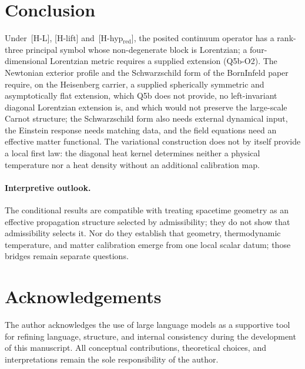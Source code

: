 \documentclass[11pt,a4paper]{article}
\begin{document}
  \section{Conclusion}
  \label{sec:conclusion}

    Under~[H-L], [H-lift] and~[H-hyp$_{\mathrm{red}}$], the posited continuum operator has a rank-three principal
    symbol whose non-degenerate block is Lorentzian; a four-dimensional Lorentzian metric requires a supplied
    extension (Q5b-O2).
    The Newtonian exterior profile and the Schwarzschild form of the Born\textendash Infeld paper require, on the
    Heisenberg carrier, a supplied spherically symmetric and asymptotically flat extension, which Q5b does not provide,
    no left-invariant diagonal Lorentzian extension is, and which would not preserve the large-scale Carnot structure;
    the Schwarzschild form also needs external dynamical input, the Einstein response needs matching data, and the field
    equations need an effective matter functional.
    The variational construction does not by itself provide a local first law: the diagonal heat
    kernel determines neither a physical temperature nor a heat density without an additional
    calibration map.

    \paragraph{Interpretive outlook.}
    The conditional results are compatible with treating spacetime geometry as an effective propagation structure
    selected by admissibility; they do not show that admissibility selects it.
    Nor do they establish that geometry, thermodynamic temperature, and matter calibration emerge
    from one local scalar datum; those bridges remain separate questions.

  \section*{Acknowledgements}

  The author acknowledges the use of large language models as a supportive tool for refining language, structure,
  and internal consistency during the development of this manuscript.
  All conceptual contributions, theoretical choices, and interpretations remain the sole responsibility of the
  author.

  
  
\end{document}

